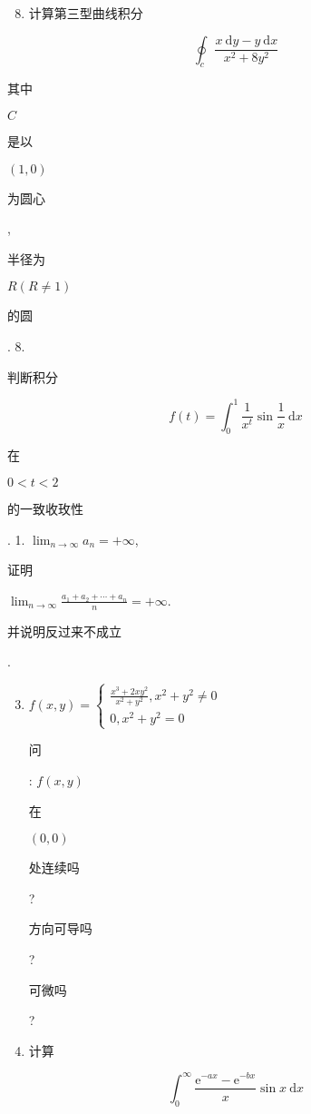 \documentclass[10pt]{article}
\begin{document}
\begin{enumerate}
  \setcounter{enumi}{7}
  \item \begin{CJK}{UTF8}{mj}计算第三型曲线积分\end{CJK}
\end{enumerate}
$$
\oint_{c} \frac{x \mathrm{~d} y-y \mathrm{~d} x}{x^{2}+8 y^{2}}
$$
\begin{CJK}{UTF8}{mj}其中\end{CJK} $C$ \begin{CJK}{UTF8}{mj}是以\end{CJK} $(1,0)$ \begin{CJK}{UTF8}{mj}为圆心\end{CJK}, \begin{CJK}{UTF8}{mj}半径为\end{CJK} $R(R \neq 1)$ \begin{CJK}{UTF8}{mj}的圆\end{CJK}. 8. \begin{CJK}{UTF8}{mj}判断积分\end{CJK}
$$
f(t)=\int_{0}^{1} \frac{1}{x^{t}} \sin \frac{1}{x} \mathrm{~d} x
$$
\begin{CJK}{UTF8}{mj}在\end{CJK} $0<t<2$ \begin{CJK}{UTF8}{mj}的一致收玫性\end{CJK}. 1. $\lim _{n \rightarrow \infty} a_{n}=+\infty$, \begin{CJK}{UTF8}{mj}证明\end{CJK} $\lim _{n \rightarrow \infty} \frac{a_{1}+a_{2}+\cdots+a_{n}}{n}=+\infty$. \begin{CJK}{UTF8}{mj}并说明反过来不成立\end{CJK}.

\begin{enumerate}
  \setcounter{enumi}{2}
  \item $f(x, y)=\left\{\begin{array}{l}\frac{x^{3}+2 x y^{2}}{x^{2}+y^{2}}, x^{2}+y^{2} \neq 0 \\ 0, x^{2}+y^{2}=0\end{array}\right.$ \begin{CJK}{UTF8}{mj}问\end{CJK}: $f(x, y)$ \begin{CJK}{UTF8}{mj}在\end{CJK} $(0,0)$ \begin{CJK}{UTF8}{mj}处连续吗\end{CJK}? \begin{CJK}{UTF8}{mj}方向可导吗\end{CJK}? \begin{CJK}{UTF8}{mj}可微吗\end{CJK}?

  \item \begin{CJK}{UTF8}{mj}计算\end{CJK}

\end{enumerate}
$$
\int_{0}^{\infty} \frac{\mathrm{e}^{-a x}-\mathrm{e}^{-b x}}{x} \sin x \mathrm{~d} x
$$
\end{document}

